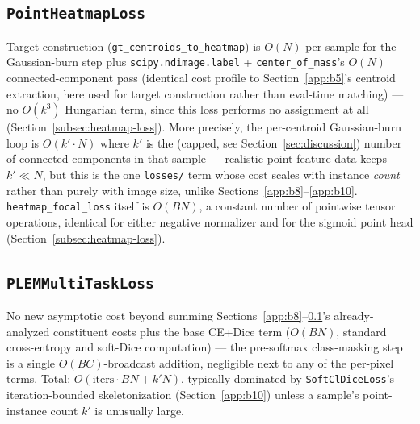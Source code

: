 \subsection{\texttt{PointHeatmapLoss}}
\label{app:b11}
Target construction (\texttt{gt\_centroids\_to\_heatmap}) is $O(N)$ per sample for the
Gaussian-burn step plus \texttt{scipy.ndimage.label} + \texttt{center\_of\_mass}'s $O(N)$
connected-component pass (identical cost profile to Section~\ref{app:b5}'s centroid extraction,
here used for target construction rather than eval-time matching) --- no $O(k^3)$ Hungarian term,
since this loss performs no assignment at all (Section~\ref{subsec:heatmap-loss}). More precisely,
the per-centroid Gaussian-burn loop is $O(k' \cdot N)$ where $k'$ is the (capped, see
Section~\ref{sec:discussion}) number of connected components in that sample --- realistic
point-feature data keeps $k' \ll N$, but this is the one \texttt{losses/} term whose cost scales
with instance \emph{count} rather than purely with image size, unlike
Sections~\ref{app:b8}--\ref{app:b10}. \texttt{heatmap\_focal\_loss} itself is $O(BN)$, a constant
number of pointwise tensor operations, identical for either negative normalizer and for the
sigmoid point head (Section~\ref{subsec:heatmap-loss}).

\subsection{\texttt{PLEMMultiTaskLoss}}
\label{app:b12}
No new asymptotic cost beyond summing Sections~\ref{app:b8}--\ref{app:b11}'s already-analyzed
constituent costs plus the base CE+Dice term ($O(BN)$, standard cross-entropy and soft-Dice
computation) --- the pre-softmax class-masking step is a single $O(BC)$-broadcast addition,
negligible next to any of the per-pixel terms. Total: $O(\mathrm{iters} \cdot BN + k' N)$,
typically dominated by \texttt{SoftClDiceLoss}'s iteration-bounded skeletonization
(Section~\ref{app:b10}) unless a sample's point-instance count $k'$ is unusually large.
